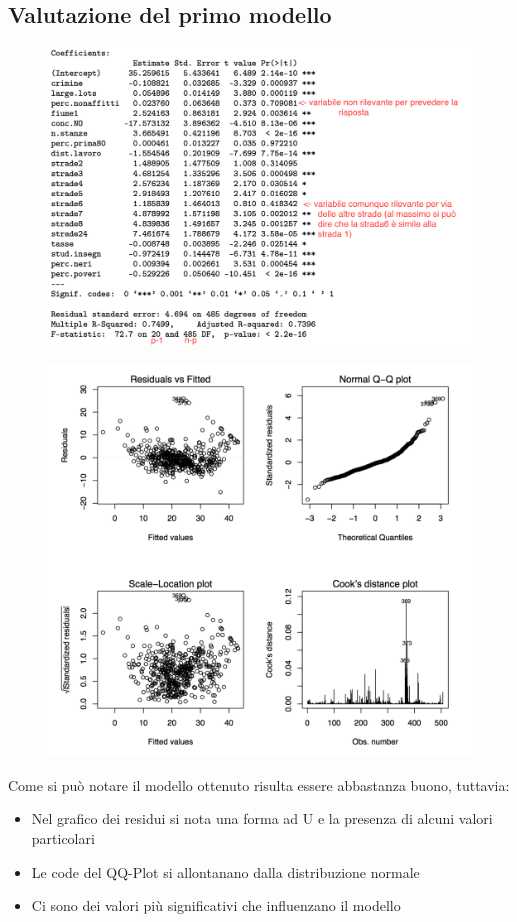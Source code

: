 \subsection{Valutazione del primo modello}

\begin{figure}[htbp]
	\centering
	\includegraphics[width=.7\textwidth]{./notes/immagini/l10-fig1.png}
\end{figure}

\begin{figure}[htbp]
	\centering
	\includegraphics[width=.7\textwidth]{./notes/immagini/l10-fig2.png}
\end{figure}

Come si può notare il modello ottenuto risulta essere abbastanza buono, tuttavia:

\begin{itemize}
	\item Nel grafico dei residui si nota una forma ad U e la presenza di alcuni valori particolari
	\item Le code del QQ-Plot si allontanano dalla distribuzione normale
	\item Ci sono dei valori più significativi che influenzano il modello
\end{itemize}

